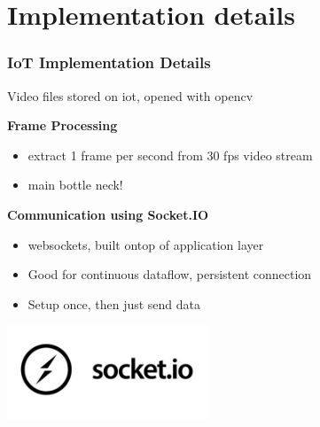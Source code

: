 \documentclass{beamer}
\begin{document}
\section{Implementation details}


\begin{frame}
\frametitle{IoT Implementation Details}
Video files stored on iot, opened with opencv

\textbf{Frame Processing}
\begin{itemize}

    \item extract 1 frame per second from 30 fps video stream
    \item main bottle neck!

    \end{itemize}

\textbf{Communication using Socket.IO}
\begin{itemize}
    \item websockets, built ontop of application layer
    \item Good for continuous dataflow, persistent connection
    \item Setup once, then just send data
\end{itemize}
\begin{center}
    \includegraphics[width=0.45\textwidth]{./res/socket-io-logo-1.jpeg}
\end{center}

\end{frame}
\end{document}
